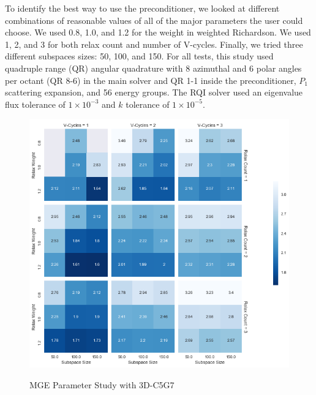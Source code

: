 \documentclass{article}                                                                           %
\begin{document}
To identify the best way to use the preconditioner, we looked at different combinations of reasonable values of all of the major parameters the user could choose. 
We used 0.8, 1.0, and 1.2 for the weight in weighted Richardson. 
We used 1, 2, and 3 for both relax count and number of V-cycles. 
Finally, we tried three different subspaces sizes: 50, 100, and 150. 
For all tests, this study used quadruple range (QR) angular quadrature \cite{Jarrell2009} with 8 azimuthal and 6 polar angles per octant (QR 8-6) in the main solver and QR 1-1 inside the preconditioner, $P_1$ scattering expansion, and 56 energy groups. 
The RQI solver used an eigenvalue flux tolerance of $1\times 10^{-3}$ and $k$ tolerance of $1\times 10^{-5}$. 

\begin{figure}
\caption{MGE Parameter Study with 3D-C5G7}
\includegraphics[width=\textwidth]{./parameter_study.png}
\label{fig:mge-dataframe}
\centering
\end{figure}
\end{document}
